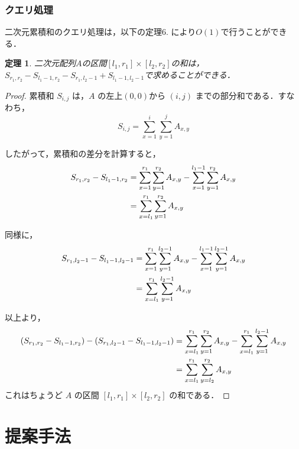 \documentclass[12pt]{jsreport}
\theoremstyle{plain} %
\newtheorem{theorem}{定理}
\theoremstyle{definition}
\begin{document}
\newpage
\subsection{クエリ処理}

二次元累積和のクエリ処理は，以下の定理6. により$O(1)$で行うことができる．

\begin{theorem}
    二次元配列$A$の区間$[l_1, r_1] \times [l_2, r_2]$の和は，$S_{r_1, r_2} - S_{l_1-1, r_2} - S_{r_1, l_2-1} + S_{l_1-1, l_2-1}$で求めることができる．
\end{theorem}

\begin{proof}
    累積和 $S_{i,j}$ は，$A$ の左上$(0, 0)$から $(i, j)$ までの部分和である．すなわち，
    \begin{equation}
        S_{i, j} = \sum_{x=1}^{i} \sum_{y=1}^{j} A_{x, y}
    \end{equation}

    したがって，累積和の差分を計算すると，
    \begin{align}
        S_{r_1, r_2} - S_{l_1-1, r_2} &= \sum_{x=1}^{r_1} \sum_{y=1}^{r_2} A_{x, y} - \sum_{x=1}^{l_1-1} \sum_{y=1}^{r_2} A_{x, y} \notag \\
        &= \sum_{x=l_1}^{r_1} \sum_{y=1}^{r_2} A_{x, y}
    \end{align}

    同様に，
    \begin{align}
        S_{r_1, l_2-1} - S_{l_1-1, l_2-1} &= \sum_{x=1}^{r_1} \sum_{y=1}^{l_2-1} A_{x, y} - \sum_{x=1}^{l_1-1} \sum_{y=1}^{l_2-1} A_{x, y} \notag \\
        &= \sum_{x=l_1}^{r_1} \sum_{y=1}^{l_2-1} A_{x, y}
    \end{align}

    以上より，
    \begin{align}
        (S_{r_1, r_2} - S_{l_1-1, r_2}) - (S_{r_1, l_2-1} - S_{l_1-1, l_2-1}) &= \sum_{x=l_1}^{r_1} \sum_{y=1}^{r_2} A_{x, y} - \sum_{x=l_1}^{r_1} \sum_{y=1}^{l_2-1} A_{x, y} \notag \\
        &= \sum_{x=l_1}^{r_1} \sum_{y=l_2}^{r_2} A_{x, y}
    \end{align}
    これはちょうど $A$ の区間 $[l_1, r_1] \times [l_2, r_2]$ の和である．
\end{proof}


\chapter{提案手法}
\end{document}
